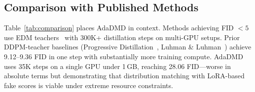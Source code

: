 \documentclass{article}
\theoremstyle{plain}
\theoremstyle{remark}
\begin{document}
\begin{table}[t]
\caption{Phase duration validation. Varying regression-only phase (Phase 1) length with aligned and misaligned warmup. All use 35K cosine schedule, $\lambda_{\text{DM}} = 5\times 10^{-5}$.}
\label{tab:phase_validation}
\centering
\small
{}
\end{table}

\subsection{Comparison with Published Methods}
\label{sec:comparison}

Table~\ref{tab:comparison} places AdaDMD in context. Methods achieving FID $<5$ use EDM teachers~\citep{karras2022elucidating} with 300K+ distillation steps on multi-GPU setups. Prior DDPM-teacher baselines (Progressive Distillation~\citep{salimans2022progressive}, Luhman \& Luhman~\citep{luhman2021knowledge}) achieve 9.12--9.36 FID in one step with substantially more training compute. AdaDMD uses 35K steps on a single GPU under 1\,GB, reaching 28.06 FID---worse in absolute terms but demonstrating that distribution matching with LoRA-based fake scores is viable under extreme resource constraints.
\end{document}
